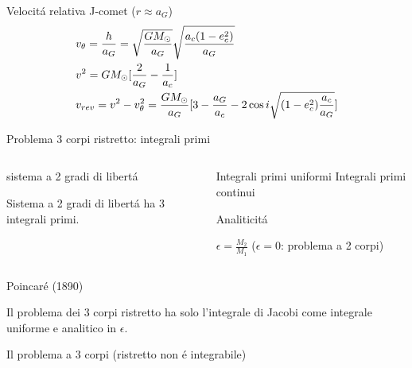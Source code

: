 \begin{wordonframe}{Velocit\'a relativa J-comet}
($r\approx a_G$)
\begin{align*}
&v_{\theta}=\frac{h}{a_G}=\sqrt{\frac{GM_{\odot}{}}{a_G}}\sqrt{\frac{a_c(1-e_c^2)}{a_G}}\\
&v^2=GM_{\odot}{}[\frac{2}{a_G}-\frac{1}{a_c}]\\
&v_{rev}=v^2-v_{\theta}^2=\frac{GM_{\odot}{}}{a_G}[3-\frac{a_G}{a_c}-2\cos{i}\sqrt{(1-e_c^2)\frac{a_c}{a_G}}]
\end{align*}

\end{wordonframe}

\begin{frame}{Problema 3 corpi ristretto: integrali primi}

\begin{columns}[T]

\begin{column}{0.5\textwidth}

\begin{block}{sistema a 2 gradi di libert\'a}

Sistema a 2 gradi di libert\'a ha 3 integrali primi.

\end{block}

\end{column}

\begin{column}{0.5\textwidth}

\begin{block}{Integrali primi uniformi}
Integrali primi continui
\end{block}

\begin{block}{Analiticit\'a}

$\epsilon=\frac{M_2}{M_1}$ ($\epsilon=0$: problema a 2 corpi)

\end{block}

\end{column}

\end{columns}

\begin{block}{Poincar\'e (1890)}

Il problema dei 3 corpi ristretto ha solo l'integrale di Jacobi come integrale uniforme e analitico in $\epsilon$.

\end{block}

Il problema a 3 corpi (ristretto non \'e integrabile)


\end{frame}
